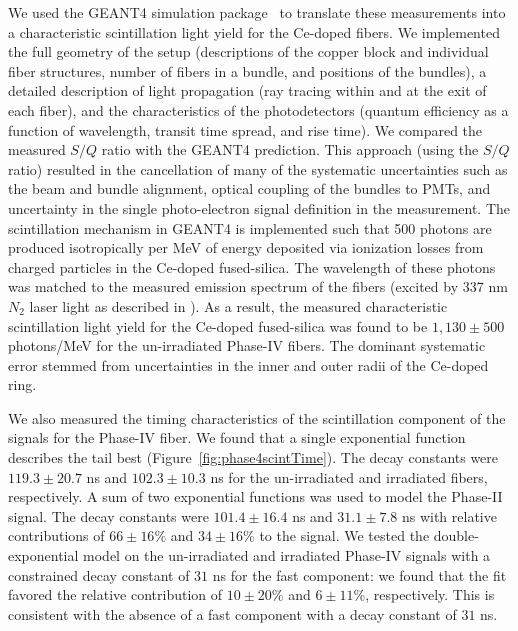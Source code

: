 \documentclass[a4paper,11pt]{article}
\begin{document}
We used the GEANT4 simulation package~\cite{r-GEANT4} to translate these measurements into a characteristic scintillation light yield for the Ce-doped fibers.  We implemented the full geometry of the setup (descriptions of the copper block and individual fiber structures, number of fibers in a bundle, and positions of the bundles), a detailed description of light propagation (ray tracing within and at the exit of each fiber), and the characteristics of the photodetectors (quantum efficiency as a function of wavelength, transit time spread, and rise time).  We compared the measured $S/Q$ ratio with the GEANT4 prediction.  This approach (using the $S/Q$ ratio) resulted in the cancellation of many of the systematic uncertainties such as the beam and bundle alignment, optical coupling of the bundles to PMTs, and uncertainty in the single photo-electron signal definition in the measurement.  The scintillation mechanism in GEANT4 is implemented such that 500 photons are produced isotropically per MeV of energy deposited via ionization losses from charged particles in the Ce-doped fused-silica. The wavelength of these photons was  matched to the measured emission spectrum of the fibers (excited by 337 nm $N_2$ laser light as described in \cite{JINSTPaper2}).  As a result, the measured characteristic scintillation light yield for the Ce-doped fused-silica was found to be $1,130\pm 500$ photons/MeV for the un-irradiated Phase-IV fibers. The dominant systematic error stemmed from uncertainties in the inner and outer radii of the Ce-doped ring. 

We also measured the timing characteristics of the scintillation component of the signals for the Phase-IV fiber. We found that a single exponential function describes the tail best (Figure~\ref{fig:phase4scintTime}). The decay constants were $119.3 \pm 20.7$ ns and $102.3 \pm 10.3$ ns for the un-irradiated and irradiated fibers, respectively. A sum of two exponential functions was used to model the Phase-II signal. The decay constants were $101.4 \pm 16.4$ ns and $31.1  \pm 7.8$ ns with relative contributions of $66 \pm 16 \%$ and $34 \pm 16 \%$ to the signal. We tested the double-exponential model on the un-irradiated and irradiated Phase-IV signals with a constrained decay constant of $31$ ns for the fast component: we found that the fit favored the relative contribution of $10 \pm 20\%$ and $6 \pm 11\%$, respectively. This is consistent with the absence of a fast component with a decay constant of $31$ ns.
\end{document}
